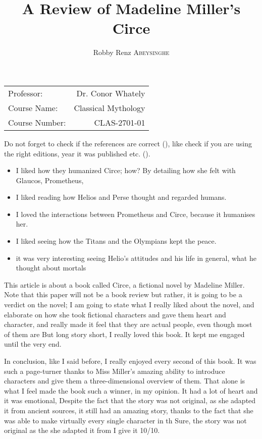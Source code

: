 \documentclass[12pt, a4paper]{article}
\author{Robby Renz \textsc{Abeysinghe}}
\title{A Review of Madeline Miller's Circe}
\begin{document}
\maketitle
\begin{center}
\begin{tabular}{l r}
Professor: & Dr. Conor Whately \\
Course Name: & Classical Mythology \\
Course Number: & CLAS-2701-01
\end{tabular}
\end{center}
\newpage

Do not forget to check if the references are correct (\cite{homer_odyssey_1998}), like check if you are using the right editions, year it was published etc. (\cite{miller_circe_2018}).

\begin{itemize}
	\item I liked how they humanized Circe; how? By detailing how she felt with Glaucos, Prometheus, 
	\item I liked reading how Helios and Perse thought and regarded humans.
	\item I loved the interactions between Prometheus and Circe, because it humanises her.
	\item I liked seeing how the Titans and the Olympians kept the peace.
	\item it was very interesting seeing Helio's attitudes and his life in general, what he thought about mortals
\end{itemize}

This article is about a book called Circe, a fictional novel by Madeline Miller. Note that this paper will not be a book review but rather, it is going to be a verdict on the novel; I am going to state what I really liked about the novel, and elaborate on how she took fictional characters and gave them heart and character, and really made it feel that they are actual people, even though most of them are But long story short, I really loved this book. It kept me engaged until the very end.

In conclusion, like I said before, I really enjoyed every second of this book. It was such a page-turner thanks to Miss Miller's amazing ability to introduce characters and give them a three-dimensional overview of them. That alone is what I feel made the book such a winner, in my opinion. It had a lot of heart and it was emotional, Despite the fact that the story was not original, as she adapted it from ancient sources, it still had an amazing story, thanks to the fact that she was able to make virtually every single character in th Sure, the story was not original as the she adapted it from I give it 10/10.


\newpage
\printbibliography
\end{document}
